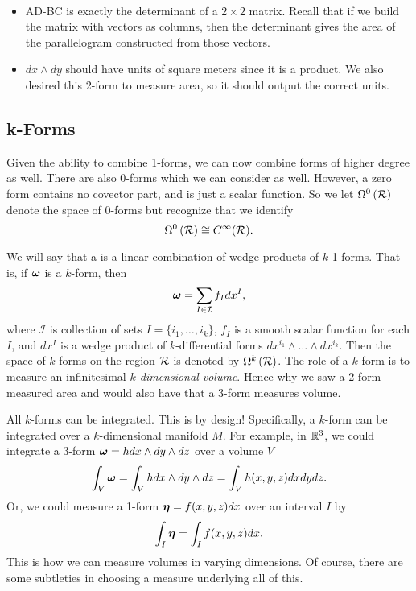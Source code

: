 \begin{answer}~
\begin{itemize}
    \item AD-BC is exactly the determinant of a $2\times 2$ matrix. Recall that if we build the matrix with vectors as columns, then the determinant gives the area of the parallelogram constructed from those vectors.
    \item $dx\wedge dy$ should have units of square meters since it is a product.  We also desired this 2-form to measure area, so it should output the correct units.
\end{itemize}
\end{answer}

\subsection{k-Forms}

Given the ability to combine 1-forms, we can now combine forms of higher degree as well.  There are also 0-forms which we can consider as well.  However, a zero form contains no covector part, and is just a scalar function. So we let $\Omega^0\left(\mathcal{R}\right)$ denote the space of 0-forms but recognize that we identify
\[
\Omega^0\left(\mathcal{R}\right) \cong C^\infty(\mathcal{R}).
\]

We will say that a  is a linear combination of wedge products of $k$ 1-forms.  That is, if $\boldsymbol{\omega}$ is a $k$-form, then
\[
\boldsymbol{\omega} = \sum_{I\in \mathcal{I}} f_I dx^{I},
\]
where $\mathcal{I}$ is collection of sets $I=\{i_1,\dots,i_k\}$, $f_I$ is a smooth scalar function for each $I$, and $dx^I$ is a wedge product of $k$-differential forms $dx^{i_1}\wedge \dots \wedge dx^{i_k}$. Then the space of $k$-forms on the region $\mathcal{R}$ is denoted by $\Omega^k\left(\mathcal{R}\right)$.  The role of a $k$-form is to measure an infinitesimal \emph{$k$-dimensional volume}.  Hence why we saw a 2-form measured area and would also have that a 3-form measures volume.

All $k$-forms can be integrated.  This is by design! Specifically, a $k$-form can be integrated over a $k$-dimensional manifold $M$.  For example, in $\mathbb{R}^3$, we could integrate a 3-form $\boldsymbol{\omega} = hdx\wedge dy \wedge dz$ over a volume $V$
\[
\int_V \boldsymbol{\omega} = \int_V hdx\wedge dy \wedge dz = \int_V h(x,y,z)dxdydz.
\]
Or, we could measure a 1-form $\boldsymbol{\eta}=f(x,y,z)dx$ over an interval $I$ by
\[
\int_I \boldsymbol{\eta} = \int_I f(x,y,z)dx.
\]
This is how we can measure volumes in varying dimensions. Of course, there are some subtleties in choosing a measure underlying all of this.

